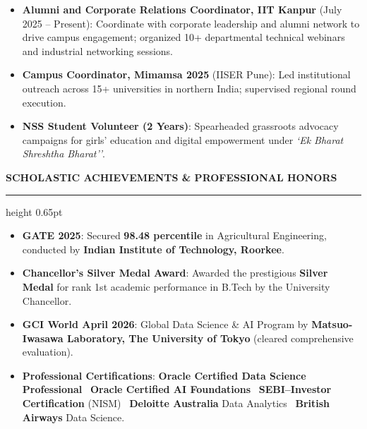 \documentclass[10pt]{article}
\newcommand{\resumesection}[1]{%
  \vspace{4pt}%
  {\large \textbf{\uppercase{#1}}}%
  \vspace{1.5pt}%
  \hrule height 0.65pt%
  \vspace{3pt}%
}
\begin{document}
\begin{itemize}[noitemsep, topsep=1pt, partopsep=0pt, parsep=0.5pt]
    \item \textbf{Alumni and Corporate Relations Coordinator, IIT Kanpur} (July 2025 -- Present): Coordinate with corporate leadership and alumni network to drive campus engagement; organized 10+ departmental technical webinars and industrial networking sessions.
    \item \textbf{Campus Coordinator, Mimamsa 2025} (IISER Pune): Led institutional outreach across 15+ universities in northern India; supervised regional round execution.
    \item \textbf{NSS Student Volunteer (2 Years)}: Spearheaded grassroots advocacy campaigns for girls' education and digital empowerment under \textit{`Ek Bharat Shreshtha Bharat''}.
\end{itemize}

\resumesection{Scholastic Achievements \& Professional Honors}

\begin{itemize}[noitemsep, topsep=1pt, partopsep=0pt, parsep=0.5pt]
    \item \textbf{GATE 2025}: Secured \textbf{98.48 percentile} in Agricultural Engineering, conducted by \textbf{Indian Institute of Technology, Roorkee}.
    \item \textbf{Chancellor's Silver Medal Award}: Awarded the prestigious \textbf{Silver Medal} for rank 1st academic performance in B.Tech by the University Chancellor.
    \item \textbf{GCI World April 2026}: Global Data Science \& AI Program by \textbf{Matsuo-Iwasawa Laboratory, The University of Tokyo} (cleared comprehensive evaluation).
    \item \textbf{Professional Certifications}: \textbf{Oracle Certified Data Science Professional} \textbullet \ \textbf{Oracle Certified AI Foundations} \textbullet \ \textbf{SEBI--Investor Certification} (NISM) \textbullet \ \textbf{Deloitte Australia} Data Analytics \textbullet \ \textbf{British Airways} Data Science.
\end{itemize}
\end{document}
